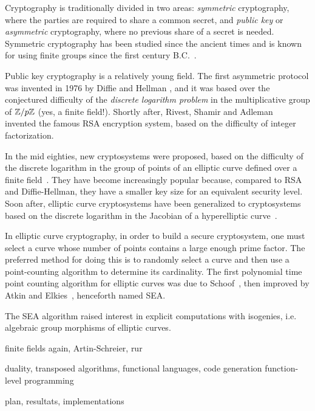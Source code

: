Cryptography is traditionally divided in two areas: \emph{symmetric}
cryptography, where the parties are required to share a common secret,
and \emph{public key} or \emph{asymmetric} cryptography, where no
previous share of a secret is needed. Symmetric cryptography has been
studied since the ancient times and is known for using finite groups
since the first century B.C.~\cite{cesar}.

Public key cryptography is a relatively young field. The first
asymmetric protocol was invented in 1976 by Diffie and Hellman
\cite{dh}, and it was based over the conjectured difficulty of the
\emph{discrete logarithm problem} in the multiplicative group of
$\mathbb{Z}/p\mathbb{Z}$ (yes, a finite field!). Shortly after, Rivest, Shamir and
Adleman~\cite{rsa} invented the famous RSA encryption system, based on
the difficulty of integer factorization.

In the mid eighties, new cryptosystems were proposed, based on the
difficulty of the discrete logarithm in the group of points of an
elliptic curve defined over a finite field~\cite{miller86,koblitz87}.
They have become increasingly popular because, compared to RSA and
Diffie-Hellman, they have a smaller key size for an equivalent
security level. Soon after, elliptic curve cryptosystems have been
generalized to cryptosystems based on the discrete logarithm in the
Jacobian of a hyperelliptic curve~\cite{koblitz89}.

In elliptic curve cryptography, in order to build a secure
cryptosystem, one must select a curve whose number of points contains
a large enough prime factor. The preferred method for doing this is to
randomly select a curve and then use a point-counting algorithm to
determine its cardinality. The first polynomial time point counting
algorithm for elliptic curves was due to Schoof~\cite{schoof85}, then
improved by Atkin and
Elkies~\cite{atkin88,elkies92,elkies98,schoof95}, henceforth named
SEA.

The SEA algorithm raised interest in explicit computations with
isogenies, i.e. algebraic group morphisms of elliptic curves. 


finite fields again, Artin-Schreier, rur

duality, transposed algorithms, functional languages, code generation
function-level programming



plan, resultats, implementations







